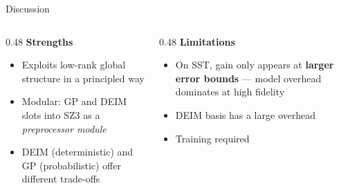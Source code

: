 \documentclass[aspectratio=169, 11pt]{beamer}
\begin{document}
\begin{frame}{Discussion}
\begin{columns}[T]

\begin{column}{0.48\textwidth}
  \textcolor{cteal}{\textbf{Strengths}}\vspace{0.2em}
  \begin{itemize}\setlength\itemsep{0.3em}\small
    \item Exploits low-rank global structure in a principled way
    \item Modular: GP and DEIM slots into SZ3 as a \emph{preprocessor module}
    \item DEIM (deterministic) and GP (probabilistic) offer different trade-offs
  \end{itemize}
\end{column}

\begin{column}{0.48\textwidth}
  \textcolor{cteal}{\textbf{Limitations}}\vspace{0.2em}
  \begin{itemize}\setlength\itemsep{0.3em}\small
    \item On SST, gain only appears at \textbf{larger error bounds} --- model overhead dominates at high fidelity
    \item DEIM basis has a large overhead
    \item Training required
  \end{itemize}
\end{column}

\end{columns}
\end{frame}
\end{document}
